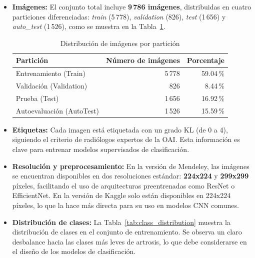 \documentclass[11pt,spanish,listoffigures,listoftables]{tfgetsinf}
\begin{document}
\begin{itemize}
    \item \textbf{Imágenes:} El conjunto total incluye \textbf{9\,786 imágenes}, distribuidas en cuatro particiones diferenciadas: \textit{train} (5\,778), \textit{validation} (826), \textit{test} (1\,656) y \textit{auto\_test} (1\,526), como se muestra en la Tabla~\ref{tab:splits}.
    
    \begin{table}[h]
        \centering
        \caption{Distribución de imágenes por partición}
        \label{tab:splits}
        \begin{tabular}{lrr}
            \toprule
            \textbf{Partición} & \textbf{Número de imágenes} & \textbf{Porcentaje} \\
            \midrule
            Entrenamiento (Train) & 5\,778 & 59.04\,\% \\
            Validación (Validation) & 826 & 8.44\,\% \\
            Prueba (Test) & 1\,656 & 16.92\,\% \\
            Autoevaluación (AutoTest) & 1\,526 & 15.59\,\% \\
            \bottomrule
        \end{tabular}
    \end{table}

    \item \textbf{Etiquetas:} Cada imagen está etiquetada con un grado KL (de 0 a 4), siguiendo el criterio de radiólogos expertos de la OAI. Esta información es clave 
    para entrenar modelos supervisados de clasificación.

    \item \textbf{Resolución y preprocesamiento:} En la versión de Mendeley, las imágenes se encuentran disponibles en dos resoluciones estándar: \textbf{224x224} y 
    \textbf{299x299} píxeles, facilitando el uso de arquitecturas preentrenadas como ResNet o EfficientNet. En la versión de Kaggle solo están disponibles en 224x224
    píxeles, lo que la hace más directa para su uso en modelos CNN comunes.

    \item \textbf{Distribución de clases:} La Tabla~\ref{tab:class_distribution} muestra la distribución de clases en el conjunto de entrenamiento. Se observa un claro 
    desbalance hacia las clases más leves de artrosis, lo que debe considerarse en el diseño de los modelos de clasificación.


\end{itemize}
\end{document}
